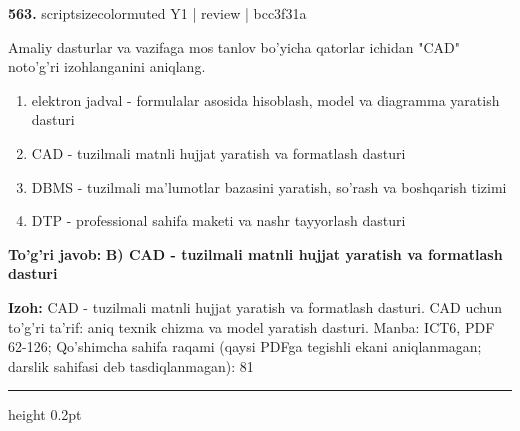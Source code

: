 \documentclass[10pt,a4paper]{article}
\begin{document}
{\bfseries\sffamily\color{ink} 563.} {scriptsizecolor{muted} Y1 | review | bcc3f31a}
\par
Amaliy dasturlar va vazifaga mos tanlov bo'yicha qatorlar ichidan "CAD" noto'g'ri izohlanganini aniqlang.
\begin{enumerate}[label=\Alph*),leftmargin=9mm]
\item elektron jadval - formulalar asosida hisoblash, model va diagramma yaratish dasturi
\item CAD - tuzilmali matnli hujjat yaratish va formatlash dasturi
\item DBMS - tuzilmali ma'lumotlar bazasini yaratish, so'rash va boshqarish tizimi
\item DTP - professional sahifa maketi va nashr tayyorlash dasturi
\end{enumerate}
\begin{tcolorbox}[enhanced,breakable,colback=teal!4,colframe=teal!60!black,boxrule=0.45pt,arc=1.2mm,left=2.7mm,right=2.7mm,top=1.8mm,bottom=1.8mm,before skip=2mm,after skip=2mm]
{\bfseries\sffamily\color{teal}To'g'ri javob:} \textbf{B) CAD - tuzilmali matnli hujjat yaratish va formatlash dasturi}
\par\smallskip
{\bfseries Izoh:} CAD - tuzilmali matnli hujjat yaratish va formatlash dasturi. CAD uchun to'g'ri ta'rif: aniq texnik chizma va model yaratish dasturi. Manba: ICT6, PDF 62-126; Qo'shimcha sahifa raqami (qaysi PDFga tegishli ekani aniqlanmagan; darslik sahifasi deb tasdiqlanmagan): 81
\end{tcolorbox}
\vspace{2mm}\hrule height 0.2pt\vspace{3mm}
\end{document}

